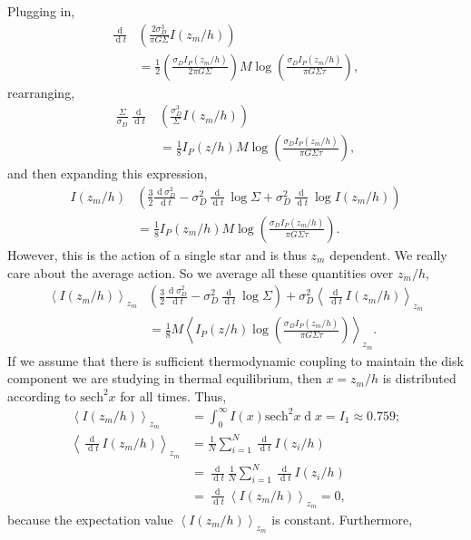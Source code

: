 \documentclass[usenatbib]{mnras}
\renewcommand{\d}[1]{\! \mathrm{d}#1 \:}
\newcommand{\deriv}[2]{\frac{\d{#1}}{\d{#2}}}
\newcommand{\sech}{\mathrm{sech}}
\newcommand{\EV}[1]{\left< #1 \right>}
\renewcommand{\d}[1]{\ensuremath{\operatorname{d}\!{#1}}}
\begin{document}
Plugging in,
\begin{align}
\deriv{}{t} & \left( \frac{2 \sigma_D^3}{\pi G \Sigma} I(z_m / h) \right) 
\\
& = \frac{1}{2} \left( \frac{\sigma_D I_P(z_m / h)}{2 \pi G \Sigma} \right) M \log{\left( \frac{\sigma_D I_P(z_m / h)}{\pi G \Sigma \tau}  \right)}, \nonumber
\end{align}
rearranging,
\begin{align}
\frac{\Sigma} {\sigma_D} \deriv{}{t} & \left( \frac{\sigma_D^3}{\Sigma} I(z_m / h) \right) 
\\
& = \frac{1}{8}  I_P(z / h) M \log{\left( \frac{\sigma_D I_P(z_m / h)}{\pi G \Sigma \tau} \right)}, \nonumber
\end{align}
and then expanding this expression,
\begin{align}
I(z_m / h) & \left( \frac{3}{2} \deriv{\sigma_D^2}{t} - \sigma_D^2 \deriv{}{t} \log{\Sigma} + \sigma_D^2 \deriv{}{t} \log{I(z_m / h)} \right) 
\\
& = \frac{1}{8}  I_P(z_m / h) M \log{\left( \frac{\sigma_D I_P(z_m / h)}{\pi G \Sigma \tau} \right)}. \nonumber
\end{align}
However, this is the action of a single star and is thus $z_m$ dependent. We really care about the average action. So we average all these quantities over $z_m / h$,
\begin{align}
\EV{I(z_m / h)}_{z_m} & \left( \frac{3}{2} \deriv{\sigma_D^2}{t} - \sigma_D^2 \deriv{}{t} \log{\Sigma} \right) + \sigma_D^2 \EV{\deriv{}{t} I(z_m / h) }_{z_m}  
\\
&= \frac{1}{8} M \EV{ I_P(z / h) \log{\left( \frac{\sigma_D I_P(z_m / h)}{\pi G \Sigma \tau} \right)} }_{z_m}. \nonumber
\end{align}
If we assume that there is sufficient thermodynamic coupling to maintain the disk component we are studying in thermal equilibrium, then $x = z_m / h$ is distributed according to $\sech^2{x}$ for all times. Thus,
\begin{align}
\EV{I(z_m / h)}_{z_m} & = \int_0^\infty I(x) \sech^2{x} \d{x} = I_1 \approx 0.759;
\\
\EV{\deriv{}{t} I(z_m / h) }_{z_m} & = \frac{1}{N} \sum_{i = 1}^N \deriv{}{t} I(z_i / h)
\\
& = \deriv{}{t} \frac{1}{N} \sum_{i = 1}^N \deriv{}{t} I(z_i / h) \nonumber
\\
& = \deriv{}{t} \EV{I(z_m / h)}_{z_m} = 0, \nonumber
\end{align}
because the expectation value $\EV{I(z_m / h)}_{z_m}$ is constant. Furthermore,
\end{document}
